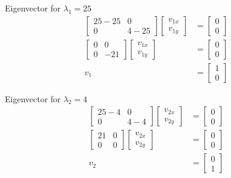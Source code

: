 \documentclass[11pt,letterpaper]{article}
\begin{document}
\begin{enumerate}
Eigenvector for \( \lambda_1 = 25 \)
\begin{align*}
    \begin{bmatrix}
        25-25 & 0 \\
        0 & 4-25
    \end{bmatrix}
    \begin{bmatrix}
        v_{1x} \\ v_{1y}
    \end{bmatrix}
    &= \begin{bmatrix}
        0 \\ 0
    \end{bmatrix} \\
    \begin{bmatrix}
        0 & 0 \\
        0 & -21
    \end{bmatrix}
    \begin{bmatrix}
        v_{1x} \\ v_{1y}
    \end{bmatrix}
    &= \begin{bmatrix}
        0 \\ 0
    \end{bmatrix} \\
    v_1
    &= \begin{bmatrix}
        1 \\ 0
    \end{bmatrix}
\end{align*}

Eigenvector for \( \lambda_2 = 4 \)
\begin{align*}
    \begin{bmatrix}
        25-4 & 0 \\
        0 & 4-4
    \end{bmatrix}
    \begin{bmatrix}
        v_{2x} \\ v_{2y}
    \end{bmatrix}
    &= \begin{bmatrix}
        0 \\ 0
    \end{bmatrix} \\
    \begin{bmatrix}
        21 & 0 \\
        0 & 0
    \end{bmatrix}
    \begin{bmatrix}
        v_{2x} \\ v_{2y}
    \end{bmatrix}
    &= \begin{bmatrix}
        0 \\ 0
    \end{bmatrix} \\
    v_2
    &= \begin{bmatrix}
        0 \\ 1
    \end{bmatrix}
\end{align*}


\end{enumerate}
\end{document}
